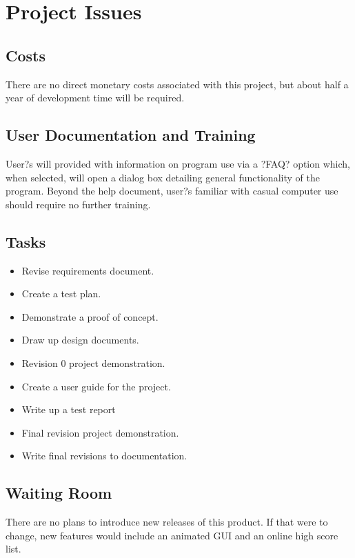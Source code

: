 \documentclass[12pt]{article}
\begin{document}
\section{Project Issues}
\subsection{Costs}
There are no direct monetary costs associated with this project, but about half a year of development
time will be required.\\

\subsection{User Documentation and Training}
User?s will provided with information on program use via a ?FAQ? option which, when selected, will
open a dialog box detailing general functionality of the program.
Beyond the help document, user?s familiar with casual computer use should require no further training.\\

\subsection{Tasks}
\begin{itemize}
\item Revise requirements document.
\item Create a test plan.
\item Demonstrate a proof of concept.
\item Draw up design documents.
\item Revision 0 project demonstration.
\item Create a user guide for the project.
\item Write up a test report
\item Final revision project demonstration.
\item Write final revisions to documentation.
\end{itemize}

\subsection{Waiting Room}
There are no plans to introduce new releases of this product. If that were to change, new features would include 
an animated GUI and an online high score list. 
\end{document}
